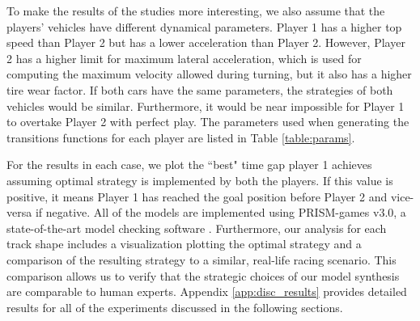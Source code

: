 To make the results of the studies more interesting, we also assume that the players' vehicles have different dynamical parameters. Player 1 has a higher top speed than Player 2 but has a lower acceleration than Player 2. However, Player 2 has a higher limit for maximum lateral acceleration, which is used for computing the maximum velocity allowed during turning, but it also has a higher tire wear factor. If both cars have the same parameters, the strategies of both vehicles would be similar. Furthermore, it would be near impossible for Player 1 to overtake Player 2 with perfect play. The parameters used when generating the transitions functions for each player are listed in Table \ref{table:params}.

\begin{table}
\caption{Parameters used to generate transitions for the model tested in the case study scenarios.}
\label{table:params}
\end{table}

For the results in each case, we plot the ``best" time gap player 1 achieves assuming optimal strategy is implemented by both the players. If this value is positive, it means Player 1 has reached the goal position before Player 2 and vice-versa if negative. All of the models are implemented using PRISM-games v3.0, a state-of-the-art model checking software \cite{prismgames}. Furthermore, our analysis for each track shape includes a visualization plotting the optimal strategy and a comparison of the resulting strategy to a similar, real-life racing scenario. This comparison allows us to verify that the strategic choices of our model synthesis are comparable to human experts. Appendix \ref{app:disc_results} provides detailed results for all of the experiments discussed in the following sections. 

